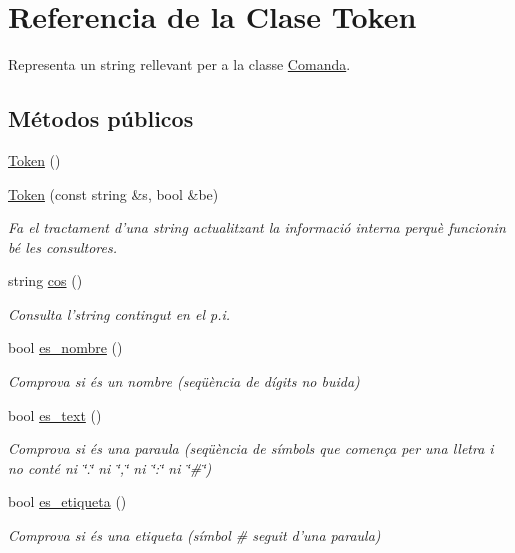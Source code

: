 \hypertarget{class_token}{\section{Referencia de la Clase Token}
\label{class_token}
}


Representa un string rellevant per a la classe \hyperlink{class_comanda}{Comanda}.  


\subsection*{Métodos públicos}
\begin{DoxyCompactItemize}
\item 
\hyperlink{class_token_aa3c5868ba4115f3189df6b2ac5b36f39}{Token} ()
\item 
\hyperlink{class_token_a2ecb0099476455ed7ce3c05abcbb2e31}{Token} (const string \&s, bool \&be)
\begin{DoxyCompactList}\small\item\em Fa el tractament d'una string actualitzant la informació interna perquè funcionin bé les consultores. \end{DoxyCompactList}\item 
string \hyperlink{class_token_a3cadf105c92e161b50eea2d8096cb608}{cos} ()
\begin{DoxyCompactList}\small\item\em Consulta l'string contingut en el p.\-i. \end{DoxyCompactList}\item 
bool \hyperlink{class_token_a53411d8b5b08289a126944104d246380}{es\-\_\-nombre} ()
\begin{DoxyCompactList}\small\item\em Comprova si és un nombre (seqüència de dígits no buida) \end{DoxyCompactList}\item 
bool \hyperlink{class_token_ab40c482fd70278c5f8ce53aa364d957e}{es\-\_\-text} ()
\begin{DoxyCompactList}\small\item\em Comprova si és una paraula (seqüència de símbols que comença per una lletra i no conté ni \char`\"{}.\char`\"{} ni \char`\"{},\char`\"{} ni \char`\"{}\-:\char`\"{} ni \char`\"{}\#\char`\"{}) \end{DoxyCompactList}\item 
bool \hyperlink{class_token_ad2949808a3a5d2afba78768e18005cbd}{es\-\_\-etiqueta} ()
\begin{DoxyCompactList}\small\item\em Comprova si és una etiqueta (símbol \# seguit d'una paraula) \end{DoxyCompactList}\item 

\end{DoxyCompactItemize}
